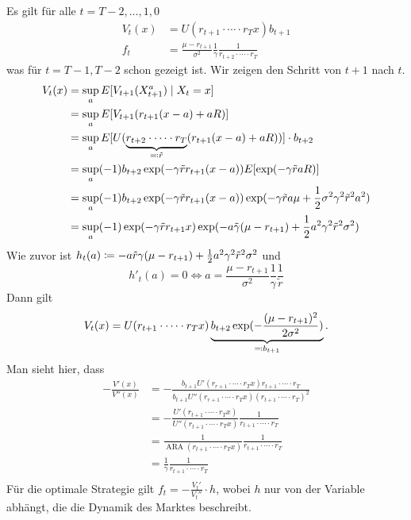 \documentclass[a4paper,twoside,DIV15,BCOR12mm]{scrbook}
\DeclareMathOperator{\ARA}{ARA}
\begin{document}
\begin{beispiel}
Es gilt für alle $t=T-2,\ldots,1, 0$
\begin{align*}
V_t(x) &= U(r_{t+1}\cdot \cdots\cdot r_T x) b_{t+1} \\
f_t &= \frac{\mu-r_{t+1}}{\sigma^2} \frac1\gamma \frac1{r_{t+2}\cdot \cdots \cdot r_T}
\end{align*}
was für $t=T-1,T-2$ schon gezeigt ist. Wir zeigen den Schritt von $t+1$ nach $t$.
\begin{align*}
V_t(x) &= \sup_a E[V_{t+1} (X_{t+1}^a) \mid X_t = x] \\
&= \sup_a E[V_{t+1} (r_{t+1} (x-a) + aR)] \\
&= \sup_a E[U(\underbrace{r_{t+2}\cdot \cdots\cdot r_T}_{\ad \tilde r} (r_{t+1} (x-a) + aR))]\cdot b_{t+2} \\
&= \sup_a (-1) b_{t+2} \exp(-\gamma \tilde r r_{t+1} (x-a)) E[\exp(-\gamma \tilde r a R)]\\
&= \sup_a (-1) b_{t+2} \exp(-\gamma \tilde r r_{t+1} (x-a)) \exp(-\gamma \tilde r a \mu + \frac12 \sigma^2 \gamma ^2 \tilde r^2 a^2) \\
&= \sup_a (-1) \exp(-\gamma\tilde r r_{t+1} x) \exp(-a\tilde \gamma(\mu-r_{t+1}) + \frac12 a^2 \gamma ^2 \tilde r^2 \sigma^2)
\end{align*}
Wie zuvor ist $h_t(a) \da -a\tilde r \gamma(\mu- r_{t+1}) + \frac12 a^2 \gamma^2 \tilde r^2 \sigma^2$ und
\[
h'_t(a) = 0 \iff
a= \frac{\mu-r_{t+1}}{\sigma^2} \frac1\gamma \frac1{\tilde r}
\]
Dann gilt
\begin{align*}
V_t(x) = U(r_{t+1} \cdot \cdots \cdot r_T x) \underbrace{b_{t+2} \exp(-\frac{(\mu-r_{t+1})^2}{2\sigma^2})}_{\ad b_{t+1}}.
\end{align*}
Man sieht hier, dass 
\begin{align*}
-\frac{V'(x)}{V''(x)} &= - \frac{ b_{t+1} U'(r_{r+1}\cdot\cdots\cdot r_T x) r_{t+1}\cdot\cdots\cdot r_T}{b_{t+1} U''(r_{r+1}\cdot\cdots\cdot r_T x) (r_{t+1}\cdot\cdots\cdot r_T)^2} \\
&= - \frac{U'(r_{t+1}\cdot\cdots\cdot r_T x)}{U''(r_{t+1}\cdot\cdots\cdot r_Tx)} \frac1{r_{t+1}\cdot\cdots\cdot r_T} \\
&= \frac1{\ARA(r_{t+1}\cdot\cdots\cdot r_Tx)} \frac1{r_{t+1}\cdot\cdots\cdot r_T} \\
&= \frac1{\gamma} \frac1{r_{t+1}\cdot\cdots\cdot r_T} \\ 
\end{align*}
Für die optimale Strategie gilt $f_t = -\frac{V_t'}{V_t''} \cdot h$, wobei $h$ nur von der Variable abhängt, die die Dynamik des Marktes beschreibt.
\end{beispiel}
\end{document}
